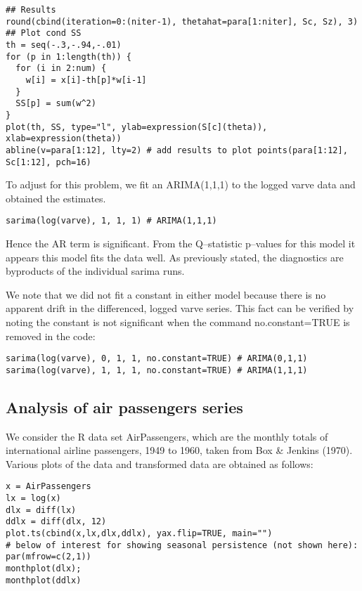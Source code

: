 \documentclass[
paper=128mm:96mm, %
fontsize=9.5pt, %
pagesize, %
parskip=half-, %
]{scrartcl} %
\theoremstyle{mythmstyle} %
\begin{document}
\begin{lstlisting}[belowskip=-0.8 \baselineskip]
## Results
round(cbind(iteration=0:(niter-1), thetahat=para[1:niter], Sc, Sz), 3) ## Plot cond SS
th = seq(-.3,-.94,-.01)
for (p in 1:length(th)) {
  for (i in 2:num) { 
  	w[i] = x[i]-th[p]*w[i-1] 
  }
  SS[p] = sum(w^2)     
}
plot(th, SS, type="l", ylab=expression(S[c](theta)),
xlab=expression(theta))
abline(v=para[1:12], lty=2) # add results to plot points(para[1:12], Sc[1:12], pch=16)
\end{lstlisting}
\clearpage

To adjust for this problem, we fit an ARIMA(1,1,1) to the logged varve data and obtained the estimates.
%
\begin{lstlisting}[belowskip=-0.8 \baselineskip]
sarima(log(varve), 1, 1, 1) # ARIMA(1,1,1)
\end{lstlisting}
%
Hence the AR term is significant. From the Q--statistic p--values for this model it appears this model fits the data well. As previously stated, the diagnostics are byproducts of the individual sarima runs. 

We note that we did not fit a constant in either model because there is no apparent drift in the differenced, logged varve series. This fact can be verified by noting the constant is not significant when the command no.constant=TRUE is removed in the code:
%
\begin{lstlisting}[belowskip=-0.8 \baselineskip]
sarima(log(varve), 0, 1, 1, no.constant=TRUE) # ARIMA(0,1,1) 
sarima(log(varve), 1, 1, 1, no.constant=TRUE) # ARIMA(1,1,1)
\end{lstlisting}
\clearpage


\subsection{Analysis of air passengers series}

We consider the R data set AirPassengers, which are the monthly totals of international airline passengers, 1949 to 1960, taken from Box \& Jenkins (1970). Various plots of the data and transformed data are obtained as follows:
%
\begin{lstlisting}[belowskip=-0.8 \baselineskip]
x = AirPassengers
lx = log(x)
dlx = diff(lx)
ddlx = diff(dlx, 12) 
plot.ts(cbind(x,lx,dlx,ddlx), yax.flip=TRUE, main="")
# below of interest for showing seasonal persistence (not shown here): 
par(mfrow=c(2,1))
monthplot(dlx); 
monthplot(ddlx)
\end{lstlisting}
\clearpage
\end{document}
